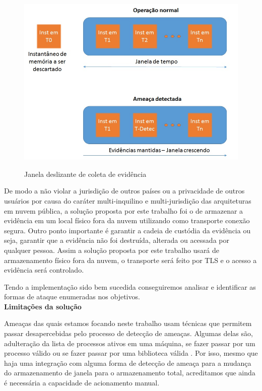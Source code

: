 \documentclass[
	12pt,				%
	openright,			%
	oneside,			%
	a4paper,			%
	english,			%
	brazil,				%
	]{abntex2}
\begin{document}
\begin{figure}[h!]
\caption{Janela deslizante de coleta de evidência}
\includegraphics[scale=0.5]{janela.jpg}
\centering
\label{fig:janela}
\end{figure}

De modo a não violar a jurisdição de outros países ou a privacidade de outros usuários por causa do caráter multi-inquilino e multi-jurisdição das arquiteturas em nuvem pública,
a solução proposta por este trabalho foi o de armazenar a evidência em um local físico fora da nuvem utilizando como transporte conexão segura. Outro ponto importante é 
garantir a cadeia de custódia da evidência ou seja, garantir que a evidência não foi destruída, alterada ou acessada por qualquer pessoa. Assim a solução proposta por este 
trabalho usará de armazenamento físico fora da nuvem, o transporte será feito por TLS e o acesso a evidência será controlado.

Tendo a implementação sido bem sucedida conseguiremos analisar e identificar as formas de ataque enumeradas nos objetivos.\\

\textbf{Limitações da solução}

Ameaças das quais estamos focando neste trabalho usam técnicas que permitem passar desapercebidas pelo processo de detecção de ameaças. Algumas delas são, 
adulteração da lista de processos ativos em uma máquina, se fazer passar por um processo válido ou se fazer passar por uma biblioteca válida \cite{Case2014}. Por isso, 
mesmo que haja uma integração com alguma forma de detecção de ameaça para a mudança do armazenamento de janela para o armazenamento total, acreditamos que ainda é 
necessária a capacidade de acionamento manual.
\end{document}
